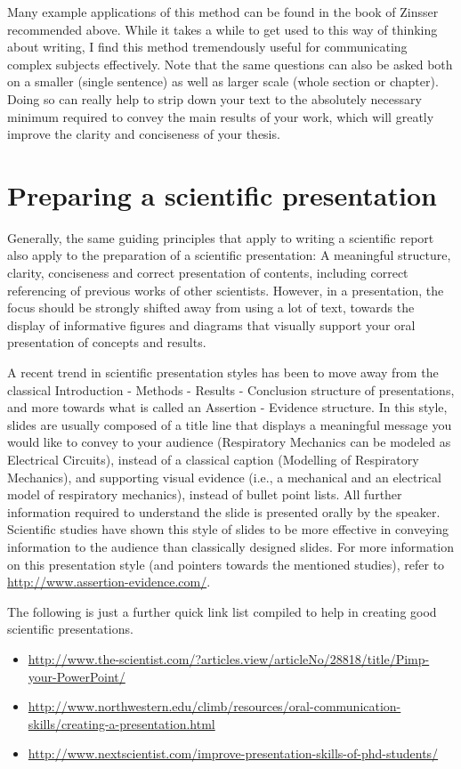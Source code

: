 Many example applications of this method can be found in the book of Zinsser recommended above.
While it takes a while to get used to this way of thinking about writing, I find this method tremendously useful for communicating complex subjects effectively.
Note that the same questions can also be asked both on a smaller (single sentence) as well as larger scale (whole section or chapter).
Doing so can really help to strip down your text to the absolutely necessary minimum required to convey the main results of your work, which will greatly improve the clarity and conciseness of your thesis.

\section{Preparing a scientific presentation}
Generally, the same guiding principles that apply to writing a scientific report also apply to the preparation of a scientific presentation: A meaningful structure, clarity, conciseness and correct presentation of contents, including correct referencing of previous works of other scientists.
However, in a presentation, the focus should be strongly shifted away from using a lot of text, towards the display of informative figures and diagrams that visually support your oral presentation of concepts and results.

A recent trend in scientific presentation styles has been to move away from the classical \glqq Introduction - Methods - Results - Conclusion\grqq{} structure of presentations, and more towards what is called an \glqq Assertion - Evidence\grqq{} structure.
In this style, slides are usually composed of a title line that displays a meaningful message you would like to convey to your audience (\glqq Respiratory Mechanics can be modeled as Electrical Circuits\grqq{}), instead of a classical caption (\glqq Modelling of Respiratory Mechanics\grqq{}), and supporting visual evidence (i.e., a mechanical and an electrical model of respiratory mechanics), instead of bullet point lists.
All further information required to understand the slide is  presented orally by the speaker.
Scientific studies have shown this style of slides to be more effective in conveying information to the audience than classically designed slides.
For more information on this presentation style (and pointers towards the mentioned studies), refer to \url{http://www.assertion-evidence.com/}.

The following is just a further quick link list compiled to help in creating good scientific presentations.
\begin{itemize}
\item \url{http://www.the-scientist.com/?articles.view/articleNo/28818/title/Pimp-your-PowerPoint/}
\item \url{http://www.northwestern.edu/climb/resources/oral-communication-skills/creating-a-presentation.html}
\item \url{http://www.nextscientist.com/improve-presentation-skills-of-phd-students/}
\end{itemize}


